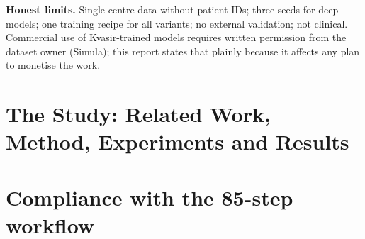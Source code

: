 \documentclass[11pt,a4paper,oneside]{report}
\begin{document}
\textbf{Honest limits.} Single-centre data without patient IDs; three seeds for deep models; one training recipe for all variants; no external validation; not clinical.
Commercial use of Kvasir-trained models requires written permission from the dataset owner (Simula); this report states that plainly because it affects any plan to monetise the work.




\chapter{The Study: Related Work, Method, Experiments and Results}








\appendix
\chapter{Compliance with the 85-step workflow}







\end{document}
